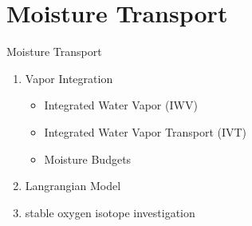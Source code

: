 \section{Moisture Transport}

\begin{frame}{Moisture Transport}

\begin{enumerate}
  \item Vapor Integration
    \begin{itemize}
      \item Integrated Water Vapor (IWV)
      \item Integrated Water Vapor Transport (IVT) \cite{zhu_proposed_1998, sousa_north_2020, jiang_impact_2017, ayantobo_integrated_2022, allan_diagnosing_2016, ralph_dropsonde_2017, ralph_scale_2019}
      \item Moisture Budgets 
    \end{itemize}
  \item Langrangian Model
  \item stable oxygen isotope investigation 
  
\end{enumerate}
  
\end{frame}
